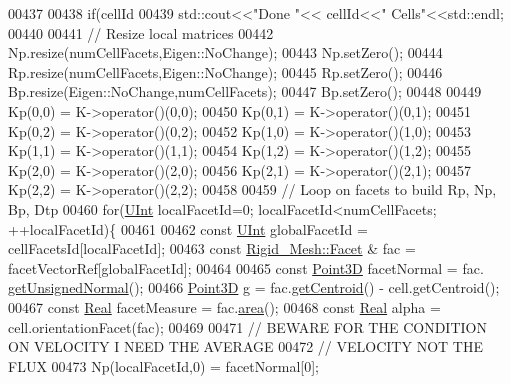 \begin{DoxyCode}
00437 
00438         \textcolor{keywordflow}{if}(cellId %
00439             std::cout<<\textcolor{stringliteral}{"Done "}<< cellId<<\textcolor{stringliteral}{" Cells"}<<std::endl;
00440 
00441         \textcolor{comment}{// Resize local matrices}
00442         Np.resize(numCellFacets,Eigen::NoChange);
00443         Np.setZero();
00444         Rp.resize(numCellFacets,Eigen::NoChange);
00445         Rp.setZero();
00446         Bp.resize(Eigen::NoChange,numCellFacets);
00447         Bp.setZero();
00448 
00449         Kp(0,0) = K->operator()(0,0);
00450         Kp(0,1) = K->operator()(0,1);
00451         Kp(0,2) = K->operator()(0,2);
00452         Kp(1,0) = K->operator()(1,0);
00453         Kp(1,1) = K->operator()(1,1);
00454         Kp(1,2) = K->operator()(1,2);
00455         Kp(2,0) = K->operator()(2,0);
00456         Kp(2,1) = K->operator()(2,1);
00457         Kp(2,2) = K->operator()(2,2);
00458 
00459                 \textcolor{comment}{// Loop on facets to build Rp, Np, Bp, Dtp}
00460         \textcolor{keywordflow}{for}(\hyperlink{namespaceFVCode3D_a4bf7e328c75d0fd504050d040ebe9eda}{UInt} localFacetId=0; localFacetId<numCellFacets; ++localFacetId)\{
00461                         
00462             \textcolor{keyword}{const} \hyperlink{namespaceFVCode3D_a4bf7e328c75d0fd504050d040ebe9eda}{UInt} globalFacetId = cellFacetsId[localFacetId];
00463             \textcolor{keyword}{const} \hyperlink{classFVCode3D_1_1Rigid__Mesh_1_1Facet}{Rigid\_Mesh::Facet} & fac = facetVectorRef[globalFacetId];
00464 
00465                         \textcolor{keyword}{const} \hyperlink{classFVCode3D_1_1Point3D}{Point3D} facetNormal     = fac.
      \hyperlink{classFVCode3D_1_1Rigid__Mesh_1_1Facet_ae8d74e38b74075a3ced8b1a229860120}{getUnsignedNormal}();
00466             \hyperlink{classFVCode3D_1_1Point3D}{Point3D} g                     = fac.\hyperlink{classFVCode3D_1_1Rigid__Mesh_1_1Facet_a0d4bcc392ef3da56ccdb40c22b6319e3}{getCentroid}() - cell.getCentroid();
00467             \textcolor{keyword}{const} \hyperlink{namespaceFVCode3D_a40c1f5588a248569d80aa5f867080e83}{Real} facetMeasure       = fac.\hyperlink{classFVCode3D_1_1Rigid__Mesh_1_1Facet_a19b2922eb0458019c8f34b40f0517789}{area}();
00468             \textcolor{keyword}{const} \hyperlink{namespaceFVCode3D_a40c1f5588a248569d80aa5f867080e83}{Real} alpha              = cell.orientationFacet(fac);
00469             
00471             \textcolor{comment}{// BEWARE FOR THE CONDITION ON VELOCITY I NEED THE AVERAGE}
00472             \textcolor{comment}{// VELOCITY NOT THE FLUX}
00473             Np(localFacetId,0) = facetNormal[0];

\end{DoxyCode}
